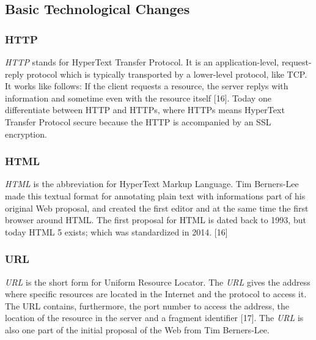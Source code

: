 \documentclass[runningheads]{llncs}
\begin{document}
			\subsection{Basic Technological Changes}
		\subsubsection{HTTP}
		\leavevmode\newline
		\textit{HTTP} stands for HyperText Transfer Protocol. It is an application-level, request-reply protocol which is typically transported by a lower-level protocol, like TCP. It works like follows: If the client requests a resource, the server replys with information and sometime even with the resource itself [16]. Today one differentiate between HTTP and HTTPs, where HTTPs means HyperText Transfer Protocol secure because the HTTP is accompanied by an SSL encryption.
		\subsubsection{HTML}
		\leavevmode\newline
		\textit{HTML} is the abbreviation for HyperText Markup Language. Tim Berners-Lee made this textual format for annotating plain text with informations part of his original Web proposal, and created the first editor and at the same time the first browser around HTML. The first proposal for HTML is dated back to 1993, but today HTML 5 exists; which was standardized in 2014. [16]
		\subsubsection{URL}
		\leavevmode\newline
		\textit{URL} is the short form for Uniform Resource Locator. The \textit{URL} gives the address where specific resources are located in the Internet and the protocol to access it. The URL contains, furthermore, the port number to access the address, the location of the resource in the server and a fragment identifier [17]. The \textit{URL} is also one part of the initial proposal of the Web from Tim Berners-Lee. 
\end{document}
